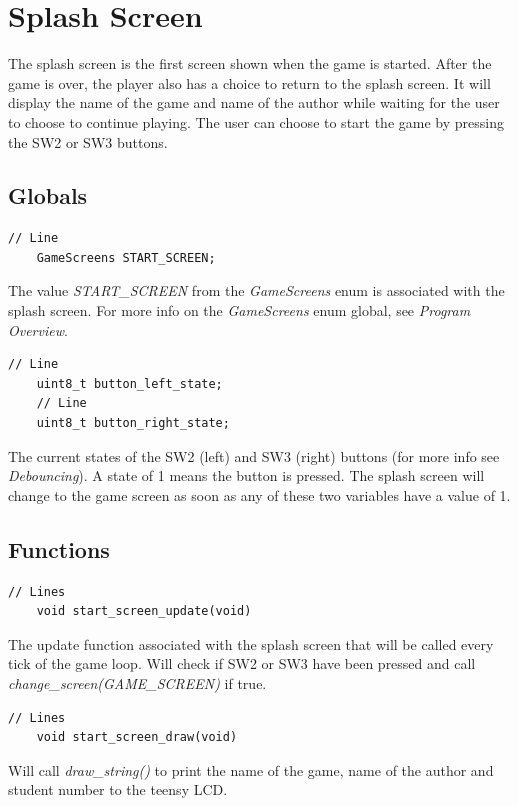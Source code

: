 \documentclass{article}
\begin{document}
\section{Splash Screen}
The splash screen is the first screen shown when the game is started. After the game is over, the player also has a choice to return to the splash screen. It will display the name of the game and name of the author while waiting for the user to choose to continue playing. The user can choose to start the game by pressing the SW2 or SW3 buttons.

\subsection*{Globals}
\begin{lstlisting}[style=CStyle]
	// Line 
	GameScreens START_SCREEN;
\end{lstlisting}
The value \emph{START\_SCREEN} from the \emph{GameScreens} enum is associated with the splash screen. For more info on the \emph{GameScreens} enum global, see \emph{Program Overview}. 
\begin{lstlisting}[style=CStyle]
	// Line 
	uint8_t button_left_state;
	// Line
	uint8_t button_right_state;
\end{lstlisting}
The current states of the SW2 (left) and SW3 (right) buttons (for more info see \emph{Debouncing}). A state of 1 means the button is pressed. The splash screen will change to the game screen as soon as any of these two variables have a value of 1. 
\newline

\subsection*{Functions}
\begin{lstlisting}[style=CStyle]
	// Lines 
	void start_screen_update(void)
\end{lstlisting}
The update function associated with the splash screen that will be called every tick of the game loop. Will check if SW2 or SW3 have been pressed and call \emph{change\_screen(GAME\_SCREEN)} if true.
\begin{lstlisting}[style=CStyle]
	// Lines 
	void start_screen_draw(void)
\end{lstlisting}
Will call \emph{draw\_string()} to print the name of the game, name of the author and student number to the teensy LCD.  
\newline
\end{document}
